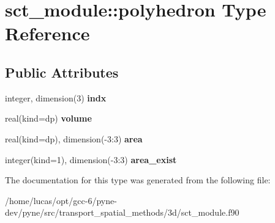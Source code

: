 \hypertarget{structsct__module_1_1polyhedron}{}\section{sct\+\_\+module\+:\+:polyhedron Type Reference}
\label{structsct__module_1_1polyhedron}
\subsection*{Public Attributes}
\begin{DoxyCompactItemize}
\item 
integer, dimension(3) {\bfseries indx}\hypertarget{structsct__module_1_1polyhedron_a0a9f5f4cc18647a9ebeb2318bc83dfa7}{}\label{structsct__module_1_1polyhedron_a0a9f5f4cc18647a9ebeb2318bc83dfa7}

\item 
real(kind=dp) {\bfseries volume}\hypertarget{structsct__module_1_1polyhedron_a20eae3d573880fd36935c35d3b1d6c75}{}\label{structsct__module_1_1polyhedron_a20eae3d573880fd36935c35d3b1d6c75}

\item 
real(kind=dp), dimension(-\/3\+:3) {\bfseries area}\hypertarget{structsct__module_1_1polyhedron_aa39269bf2d196995f86f0b365b7c46dd}{}\label{structsct__module_1_1polyhedron_aa39269bf2d196995f86f0b365b7c46dd}

\item 
integer(kind=1), dimension(-\/3\+:3) {\bfseries area\+\_\+exist}\hypertarget{structsct__module_1_1polyhedron_a4d8b6322e32640812e3c917645febc0b}{}\label{structsct__module_1_1polyhedron_a4d8b6322e32640812e3c917645febc0b}

\end{DoxyCompactItemize}


The documentation for this type was generated from the following file\+:\begin{DoxyCompactItemize}
\item 
/home/lucas/opt/gcc-\/6/pyne-\/dev/pyne/src/transport\+\_\+spatial\+\_\+methods/3d/sct\+\_\+module.\+f90\end{DoxyCompactItemize}
